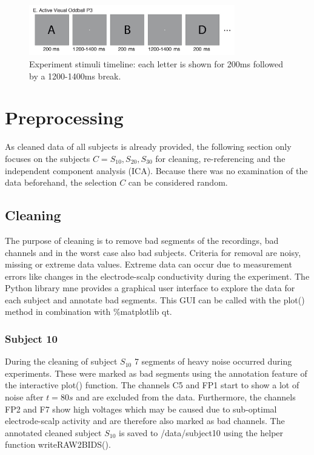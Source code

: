 \documentclass[a4paper]{article}
\begin{document}
\begin{figure}[tbh!] 
  \centering
     \includegraphics[width=0.8\textwidth]{eeg_visual_oddball.png}
  \caption{Experiment stimuli timeline: each letter is shown for 200ms followed by a 1200-1400ms break.}
  \label{fig:visual_oddball}
\end{figure}

\section{Preprocessing}
\label{sec:preprocessing}
As cleaned data of all subjects is already provided, the following section only focuses on the subjects $C = {S_{10}, S_{20}, S_{30}}$ for cleaning, re-referencing and the independent component analysis (ICA).
Because there was no examination of the data beforehand, the selection $C$ can be considered random.


\subsection{Cleaning}
The purpose of cleaning is to remove bad segments of the recordings, bad channels and in the worst case also bad subjects.
Criteria for removal are noisy, missing or extreme data values.
Extreme data can occur due to measurement errors like changes in the electrode-scalp conductivity during the experiment.
The Python library mne provides a graphical user interface to explore the data for each subject and annotate bad segments.
This GUI can be called with the plot() method in combination with \%matplotlib qt.

\subsubsection{Subject 10}
During the cleaning of subject $S_{10}$ 7 segments of heavy noise occurred during experiments.
These were marked as bad segments using the annotation feature of the interactive plot() function. 
The channels C5 and FP1 start to show a lot of noise after $t=80s$ and are excluded from the data.
Furthermore, the channels FP2 and F7 show high voltages which may be caused due to sub-optimal electrode-scalp activity and are therefore also marked as bad channels.
The annotated cleaned subject $S_{10}$ is saved to /data/subject10 using the helper function writeRAW2BIDS().
\end{document}
